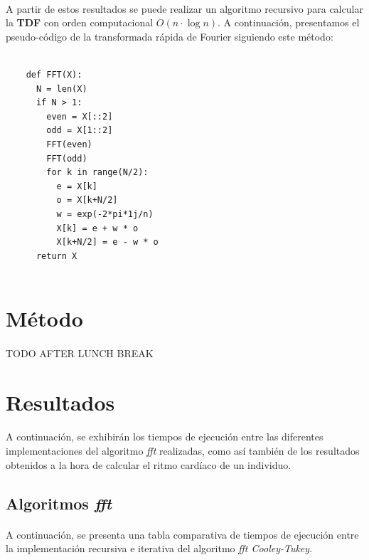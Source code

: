 \documentclass[12pt, twocolumn]{article}
\begin{document}
	\paragraph{} A partir de estos resultados se puede realizar un algoritmo recursivo para calcular la \textbf{TDF} con orden computacional $O(n\cdot \log n)$. A continuación, presentamos el pseudo-código de la transformada rápida de Fourier siguiendo este método:
	  
	  
	\begin{lstlisting}[frame=single]  % Start your code-block
	
	def FFT(X):
	  N = len(X)
	  if N > 1:
	    even = X[::2]
	    odd = X[1::2]
	    FFT(even)
	    FFT(odd)
	    for k in range(N/2):
	      e = X[k]
	      o = X[k+N/2]
	      w = exp(-2*pi*1j/n)
	      X[k] = e + w * o
	      X[k+N/2] = e - w * o
	  return X
	  
	\end{lstlisting}
	
	
	\section{Método}
	
	\paragraph{} TODO AFTER LUNCH BREAK
	

	\section{Resultados}
	
	\paragraph{} A continuación, se exhibirán los tiempos de ejecución entre las diferentes implementaciones del algoritmo \textit{fft} realizadas, como así también de los resultados obtenidos a la hora de calcular el ritmo cardíaco de un individuo.
	
	\subsection{Algoritmos \textit{fft}}
	
	\paragraph{} A continuación, se presenta una tabla comparativa de tiempos de ejecución entre la implementación recursiva e iterativa del algoritmo \textit{fft Cooley-Tukey}.
	
\end{document}
